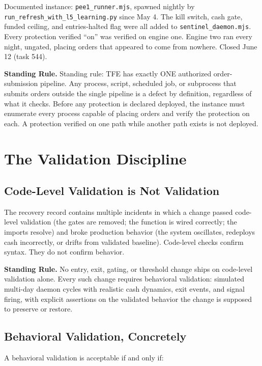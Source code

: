\documentclass[11pt, a4paper]{article}
\newcommand{\rulebox}[1]{%
  \begin{framed}\noindent\textbf{Standing Rule.} #1\end{framed}}
\theoremstyle{definition}
\begin{document}
Documented instance: \texttt{pee1\_runner.mjs}, spawned nightly by
\texttt{run\_refresh\_with\_l5\_learning.py} since May 4. The kill switch,
cash gate, funded ceiling, and entries-halted flag were all added to
\texttt{sentinel\_daemon.mjs}. Every protection verified ``on'' was verified
on engine one. Engine two ran every night, ungated, placing orders that
appeared to come from nowhere. Closed June 12 (task 544).

\rulebox{Standing rule: TFE has exactly ONE authorized order-submission
pipeline. Any process, script, scheduled job, or subprocess that submits
orders outside the single pipeline is a defect by definition, regardless of
what it checks. Before any protection is declared deployed, the instance
must enumerate every process capable of placing orders and verify the
protection on each. A protection verified on one path while another path
exists is not deployed.}

\section{The Validation Discipline}

\subsection{Code-Level Validation is Not Validation}

The recovery record contains multiple incidents in which a change passed
code-level validation (the gates are removed; the function is wired
correctly; the imports resolve) and broke production behavior (the system
oscillates, redeploys cash incorrectly, or drifts from validated baseline).
Code-level checks confirm syntax. They do not confirm behavior.

\rulebox{No entry, exit, gating, or threshold change ships on code-level
validation alone. Every such change requires behavioral validation:
simulated multi-day daemon cycles with realistic cash dynamics, exit
events, and signal firing, with explicit assertions on the validated
behavior the change is supposed to preserve or restore.}

\subsection{Behavioral Validation, Concretely}

A behavioral validation is acceptable if and only if:
\end{document}
